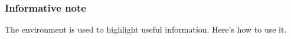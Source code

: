 \documentclass[10pt, a4paper]{article}
\begin{document}

\subsubsection{Informative note}

The  environment is used to highlight useful information. Here's how to use it.

\end{document}
